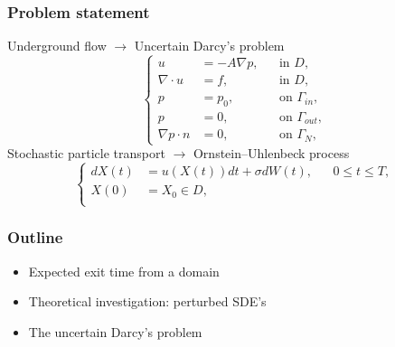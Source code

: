 \begin{frame}
\frametitle{Problem statement}
Underground flow $\rightarrow$ Uncertain Darcy's problem
\begin{equation*}
	\left \{
  	\begin{aligned}
		u &= -A \nabla p, && \text{in } D, \\
		\nabla\cdot u &= f, && \text{in } D, \\
		p &= p_0, && \text{on } \Gamma_{in},\\
		p &= 0, && \text{on } \Gamma_{out}, \\
		\nabla p \cdot n &= 0, && \text{on } \Gamma_N,
	\end{aligned} \right.
\end{equation*}
Stochastic particle transport $\rightarrow$ Ornstein–Uhlenbeck process
\begin{equation*}
	\left \{
	\begin{aligned}
		dX(t) &= u(X(t)) dt + \sigma dW(t), && 0 \leq t \leq T, \\
		X(0) &= X_0 \in D, \\
	\end{aligned} \right.
\end{equation*}
\end{frame}

\begin{frame}
\frametitle{Outline}
\begin{itemize}
	\item Expected exit time from a domain
	\item Theoretical investigation: perturbed SDE's 
	\item The uncertain Darcy's problem 
\end{itemize}
\end{frame}

